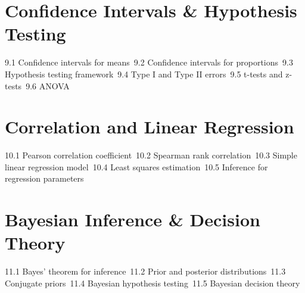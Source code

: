 \section{Confidence Intervals \& Hypothesis Testing}
9.1 Confidence intervals for means\
9.2 Confidence intervals for proportions\
9.3 Hypothesis testing framework\
9.4 Type I and Type II errors\
9.5 t-tests and z-tests\
9.6 ANOVA\
\section{Correlation and Linear Regression}
10.1 Pearson correlation coefficient\
10.2 Spearman rank correlation\
10.3 Simple linear regression model\
10.4 Least squares estimation\
10.5 Inference for regression parameters\
\section{Bayesian Inference \& Decision Theory}
11.1 Bayes' theorem for inference\
11.2 Prior and posterior distributions\
11.3 Conjugate priors\
11.4 Bayesian hypothesis testing\
11.5 Bayesian decision theory\
